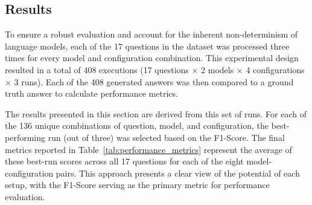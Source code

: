     \subsection{Results}


        To ensure a robust evaluation and account for the inherent non-determinism of language models, each of the 17 questions in the dataset was processed three times for every model and configuration combination. This experimental design resulted in a total of 408 executions (17 questions $\times$ 2 models $\times$ 4 configurations $\times$ 3 runs). Each of the 408 generated answers was then compared to a ground truth answer to calculate performance metrics.

        The results presented in this section are derived from this set of runs. For each of the 136 unique combinations of question, model, and configuration, the best-performing run (out of three) was selected based on the F1-Score. The final metrics reported in Table~\ref{tab:performance_metrics} represent the average of these best-run scores across all 17 questions for each of the eight model-configuration pairs. This approach presents a clear view of the potential of each setup, with the F1-Score serving as the primary metric for performance evaluation.

